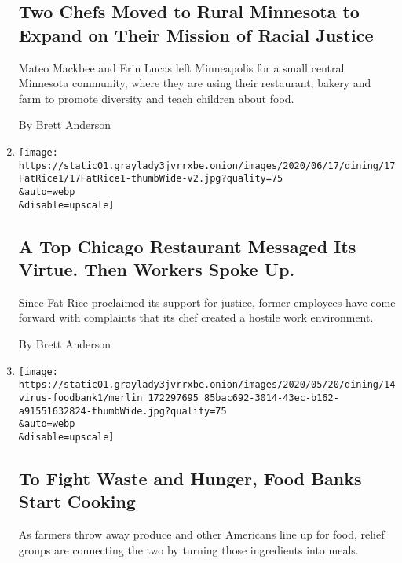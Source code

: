 \begin{enumerate}
{  \subsection{Two Chefs Moved to Rural Minnesota to Expand on Their
  Mission of Racial
  Justice}\label{two-chefs-moved-to-rural-minnesota-to-expand-on-their-mission-of-racial-justice}}

  Mateo Mackbee and Erin Lucas left Minneapolis for a small central
  Minnesota community, where they are using their restaurant, bakery and
  farm to promote diversity and teach children about food.

  By Brett Anderson
\item
  \href{/2020/06/16/dining/fat-rice-chicago-abe-conlon-racism.html}{}

  \texttt{[image: https://static01.graylady3jvrrxbe.onion/images/2020/06/17/dining/17FatRice1/17FatRice1-thumbWide-v2.jpg?quality=75\\\&auto=webp\\\&disable=upscale]}

  \hypertarget{a-top-chicago-restaurant-messaged-its-virtue-then-workers-spoke-up}{%
  \subsection{A Top Chicago Restaurant Messaged Its Virtue. Then Workers
  Spoke
  Up.}\label{a-top-chicago-restaurant-messaged-its-virtue-then-workers-spoke-up}}

  Since Fat Rice proclaimed its support for justice, former employees
  have come forward with complaints that its chef created a hostile work
  environment.

  By Brett Anderson
\item
  \href{/2020/05/14/dining/food-banks-free-meals-coronavirus.html}{}

  \texttt{[image: https://static01.graylady3jvrrxbe.onion/images/2020/05/20/dining/14virus-foodbank1/merlin\_172297695\_85bac692-3014-43ec-b162-a91551632824-thumbWide.jpg?quality=75\\\&auto=webp\\\&disable=upscale]}

  \hypertarget{to-fight-waste-and-hunger-food-banks-start-cooking}{%
  \subsection{To Fight Waste and Hunger, Food Banks Start
  Cooking}\label{to-fight-waste-and-hunger-food-banks-start-cooking}}

  As farmers throw away produce and other Americans line up for food,
  relief groups are connecting the two by turning those ingredients into
  meals.


\end{enumerate}
